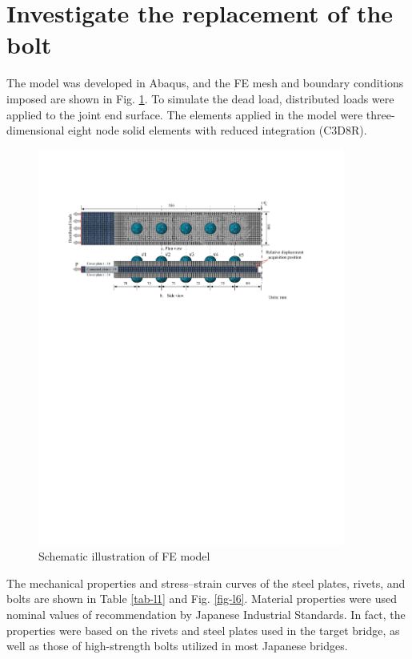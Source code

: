 \section{Investigate the replacement of the bolt}

The model was developed in Abaqus, and the FE mesh and boundary conditions imposed are shown in Fig. \ref{fig-l5}. To simulate the dead load, distributed loads were applied to the joint end surface. The elements applied in the model were three-dimensional eight node solid elements with reduced integration (C3D8R).

\begin{figure}[htbp]
    \centering
    \includegraphics[width=0.9\textwidth]{imgs/ch4/fig-l5.pdf}
    \caption{Schematic illustration of FE model}
    \label{fig-l5}
\end{figure}

The mechanical properties and stress–strain curves of the steel plates, rivets, and bolts are shown in Table \ref{tab-l1} and Fig. \ref{fig-l6}. Material properties were used nominal values of recommendation by Japanese Industrial Standards. In fact, the properties were based on the rivets and steel plates used in the target bridge, as well as those of high-strength bolts utilized in most Japanese bridges.

